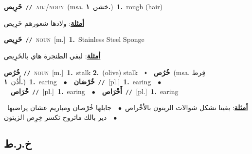 \documentclass[10pt,a4paper,twoside]{article} %
\begin{document}
\begin{multicols}{2}
{\setlength\topsep{0pt}\textbf{\foreignlanguage{arabic}{خَرِيص}}\ {\color{gray}\texttt{//}\color{black}}\ \textsc{adj/noun}\ \color{gray}(msa. \foreignlanguage{arabic}{خشن}~\foreignlanguage{arabic}{\textbf{١.}})\color{black}\ \textbf{1.}~rough (hair)\  \begin{flushright}\color{gray}\foreignlanguage{arabic}{\textbf{\underline{\foreignlanguage{arabic}{أمثلة}}}: ولادها شعورهم خَرِيص}\end{flushright}\color{black}} \vspace{2mm}

{\setlength\topsep{0pt}\textbf{\foreignlanguage{arabic}{خَرِيص}}\ {\color{gray}\texttt{//}\color{black}}\ \textsc{noun}\ [m.]\ \textbf{1.}~Stainless Steel Sponge\  \begin{flushright}\color{gray}\foreignlanguage{arabic}{\textbf{\underline{\foreignlanguage{arabic}{أمثلة}}}: ليفي الطنجرة هاي بالخَرِيص}\end{flushright}\color{black}} \vspace{2mm}

{\setlength\topsep{0pt}\textbf{\foreignlanguage{arabic}{خُرُص}}\ {\color{gray}\texttt{//}\color{black}}\ \textsc{noun}\ [m.]\ \textbf{1.}~stalk  \textbf{2.}~(olive) stalk\ \ $\smblkdiamond$\ \ \setlength\topsep{0pt}\textbf{\foreignlanguage{arabic}{خُرُص}}\ \color{gray}(msa. \foreignlanguage{arabic}{قِرط أُذُن}~\foreignlanguage{arabic}{\textbf{١.}})\color{black}\ \textbf{1.}~earing\ \ $\bullet$\ \ \setlength\topsep{0pt}\textbf{\foreignlanguage{arabic}{خُرْصَان}}\ {\color{gray}\texttt{//}\color{black}}\ [pl.]\ \textbf{1.}~earing\ \ $\bullet$\ \ \setlength\topsep{0pt}\textbf{\foreignlanguage{arabic}{خْرَاص}}\ {\color{gray}\texttt{//}\color{black}}\ [pl.]\ \textbf{1.}~earing\ \ $\bullet$\ \ \setlength\topsep{0pt}\textbf{\foreignlanguage{arabic}{أَخْرَاص}}\ {\color{gray}\texttt{//}\color{black}}\ [pl.]\ \textbf{1.}~earing\  \begin{flushright}\color{gray}\foreignlanguage{arabic}{\textbf{\underline{\foreignlanguage{arabic}{أمثلة}}}: بقينا نشكل شوالات الزيتون بالأخْراص\ $\bullet$\ \  جابلها خُرْصان ومباريم عشان يراضيها\ $\bullet$\ \  دير بالك ماتروح تكسر خِرِص الزيتون}\end{flushright}\color{black}} \vspace{2mm}

\vspace{-3mm}
\subsection*{\color{blue}\foreignlanguage{arabic}{خ.ر.ط}\color{blue}{}} 


\end{multicols}
\end{document}
